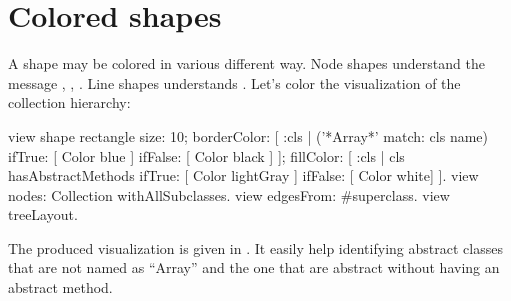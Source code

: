 \documentclass[a4paper,10pt,twoside]{book}
\begin{document}
%


%
%

\section{Colored shapes}

A shape may be colored in various different way. Node shapes understand the message , , . Line shapes understands . Let's color the visualization of the collection hierarchy:

\begin{code}{}
view shape rectangle
	size: 10;
	borderColor: [ :cls | ('*Array*' match: cls name) 
										ifTrue: [ Color blue ] 
										ifFalse: [ Color black ] ];
	fillColor: [ :cls | cls hasAbstractMethods ifTrue: [ Color lightGray ] ifFalse: [ Color white] ].
view nodes: Collection withAllSubclasses.
view edgesFrom: #superclass.
view treeLayout.
\end{code}

The produced visualization is given in . It easily help identifying abstract classes that are not named as ``Array'' and the one that are abstract without having an abstract method.
\end{document}
